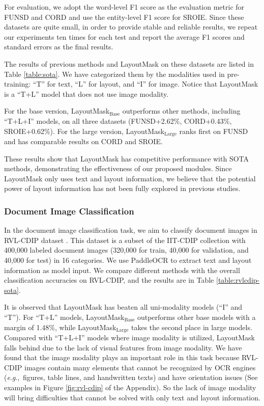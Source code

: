 \documentclass[11pt]{article}
\newcommand{\eg}{\textit{e}.\textit{g}.,\ }
\begin{document}
For evaluation, we adopt the word-level F1 score as the evaluation metric for FUNSD and CORD and use the entity-level F1 score for SROIE.
Since these datasets are quite small, in order to provide stable and reliable results, we repeat our experiments ten times for each test and report the average F1 scores and standard errors as the final results.

The results of previous methods and LayoutMask on these datasets are listed in Table \ref{table:sota}.
We have categorized them by the modalities used in pre-training: ``T'' for text, ``L'' for layout, and ``I'' for image. 
Notice that LayoutMask is a ``T+L'' model that does not use image modality. 

For the base version, LayoutMask$_\mathrm{Base}$ outperforms other methods, including ``T+L+I'' models, on all three datasets (FUNSD+2.62\%, CORD+0.43\%, SROIE+0.62\%).
For the large version, LayoutMask$_\mathrm{Large}$ ranks first on FUNSD and has comparable results on CORD and SROIE.

These results show that LayoutMask has competitive performance with SOTA methods, demonstrating the effectiveness of our proposed modules.
Since LayoutMask only uses text and layout information, we believe that the potential power of layout information has not been fully explored in previous studies. 

\subsubsection{Document Image Classification}
In the document image classification task, we aim to classify document images in RVL-CDIP dataset \citep{rvl-cdip-harley2015evaluation}.
This dataset is a subset of the IIT-CDIP collection with 400,000 labeled document images (320,000 for train, 40,000 for validation, and 40,000 for test) in 16 categories. We use PaddleOCR to extract text and layout information as model input. 
We compare different methods with the overall classification accuracies on RVL-CDIP, and the results are in Table \ref{table:rvlcdip-sota}. 

It is observed that LayoutMask has beaten all uni-modality models (``I'' and ``T'').
For ``T+L'' models, LayoutMask$_\mathrm{Base}$ outperforms other base models with a margin of 1.48\%, while LayoutMask$_\mathrm{Large}$ takes the second place in large models. 
Compared with ``T+L+I'' models where image modality is utilized, LayoutMask falls behind due to the lack of visual features from image modality. 
We have found that the image modality plays an important role in this task because RVL-CDIP images contain many elements that cannot be recognized by OCR engines (\eg figures, table lines, and handwritten texts) and have orientation issues (See examples in Figure \ref{fig:rvl-cdip} of the Appendix). 
So the lack of image modality will bring difficulties that cannot be solved with only text and layout information.
\end{document}
